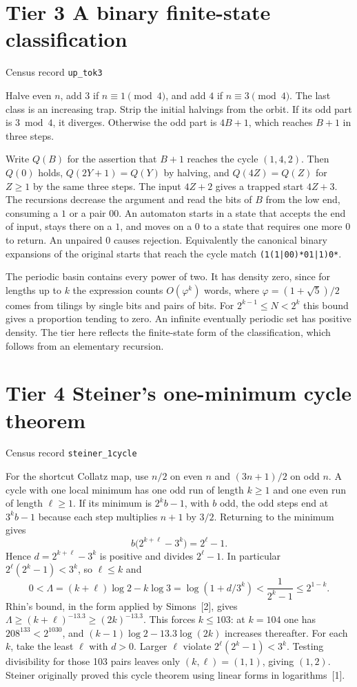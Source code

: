 \documentclass[11pt]{article}
\newcommand{\tier}[2]{%
  \section*{\color{accent}\sffamily Tier #1 \quad #2}%
}
\newcommand{\record}[1]{{\small\sffamily\color{accent} Census record \quad\texttt{#1}}\par}
\begin{document}
\newpage
\tier{3}{A binary finite-state classification}
\record{up\_tok3}
Halve even \(n\), add \(3\) if \(n\equiv1\pmod4\), and add \(4\) if
\(n\equiv3\pmod4\). The last class is an increasing trap. Strip the
initial halvings from the orbit. If its odd part is \(3\bmod4\), it diverges.
Otherwise the odd part is \(4B+1\), which reaches \(B+1\) in three steps.

Write \(Q(B)\) for the assertion that \(B+1\) reaches the cycle \((1,4,2)\).
Then \(Q(0)\) holds, \(Q(2Y+1)=Q(Y)\) by halving, and \(Q(4Z) = Q(Z)\)
for \(Z\ge1\) by the same three steps. The input \(4Z+2\) gives a trapped
start \(4Z+3\). The recursions decrease the argument and read the bits of
\(B\) from the low end, consuming a \(1\) or a pair \(00\). An automaton
starts in a state that accepts the end of input, stays there on a \(1\), and
moves on a \(0\) to a state that requires one more \(0\) to return. An
unpaired \(0\) causes rejection. Equivalently the canonical binary expansions
of the original starts that reach the cycle match \texttt{(1(1|00)*01|1)0*}.

The periodic basin contains every power of two. It has density zero, since
for lengths up to \(k\) the expression counts \(O(\varphi^k)\) words, where
\(\varphi=(1+\sqrt5)/2\) comes from tilings by single bits and pairs of bits.
For \(2^{k-1}\le N<2^k\) this bound gives a proportion tending to zero.
An infinite eventually periodic set has positive density. The tier here
reflects the finite-state form of the classification, which follows from
an elementary recursion.

\tier{4}{Steiner's one-minimum cycle theorem}
\record{steiner\_1cycle}
For the shortcut Collatz map, use \(n/2\) on even \(n\) and \((3n+1)/2\)
on odd \(n\). A cycle with one local minimum has one odd run of length
\(k\ge1\) and one even run of length \(\ell\ge1\). If its minimum is
\(2^k b-1\), with \(b\) odd, the odd steps end at \(3^k b-1\) because each
step multiplies \(n+1\) by \(3/2\). Returning to the minimum gives
\[
b\bigl(2^{k+\ell}-3^k\bigr)=2^\ell-1.
\]
Hence \(d=2^{k+\ell}-3^k\) is positive and divides \(2^\ell-1\).
In particular \(2^\ell(2^k-1)<3^k\), so \(\ell\le k\) and
\[
0<\Lambda=(k+\ell)\log 2-k\log 3
=\log(1+d/3^k)<\frac{1}{2^k-1}\le 2^{1-k}.
\]
Rhin's bound, in the form applied by Simons~[2], gives
\(\Lambda\ge(k+\ell)^{-13.3}\ge(2k)^{-13.3}\). This forces \(k\le103\):
at \(k=104\) one has \(208^{133}<2^{1030}\), and
\((k-1)\log 2-13.3\log(2k)\) increases thereafter.
For each \(k\), take the least \(\ell\) with \(d>0\). Larger \(\ell\) violate
\(2^\ell(2^k-1)<3^k\). Testing divisibility for those 103 pairs leaves
only \((k,\ell)=(1,1)\), giving \((1,2)\). Steiner originally proved this
cycle theorem using linear forms in logarithms~[1].
\end{document}

